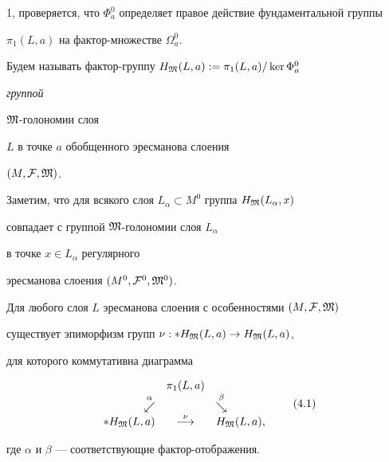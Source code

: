 1, проверяется, что  $\Phi^0_a$ определяет правое действие фундаментальной группы


$\pi_1(L,a)$ на фактор-множестве $\Omega^0_a$.


Будем называть фактор-группу  $H_{\frak M}(L,a):=\pi_1(L,a)/\ker\Phi_a^0$ {\it группой


$\frak M$-голономии слоя} $L$ в точке $a$ обобщенного эресманова слоения


$(M,{\cal F},\frak M)$.





Заметим, что для всякого слоя $L_{\alpha}\subset M^0$ группа $H_{\frak M}(L_\alpha,x)$


совпадает с группой $\frak M$-го\-ло\-но\-мии слоя $L_{\alpha}$ 


в точке $x\in L_\alpha$ регулярного


эресманова слоения $(M^0,{\cal F}^0,{\frak M}^0)$.





\begin{prop}\label{F}


Для любого слоя $L$ эресманова слоения с особенностями $(M,{\cal F},\frak M)$


существует эпиморфизм групп $\nu: *H_{\frak M}(L,a)\to H_{\frak M}(L,a)$,


для которого коммутативна диаграмма


\begin{equation}


\begin{array}{rcl}


& \pi_1(L,a) & \\


\stackrel{\alpha}{\swarrow}&&\stackrel{\beta}{\searrow}\\


\ast H_{\frak M}(L,a)&\stackrel{\nu}{\longrightarrow}&H_{\frak M}(L,a),


\end{array}\tag{4.1}


\end{equation}


где $\alpha$ и $\beta$ --- соответствующие фактор-отображения.


\end{prop}






